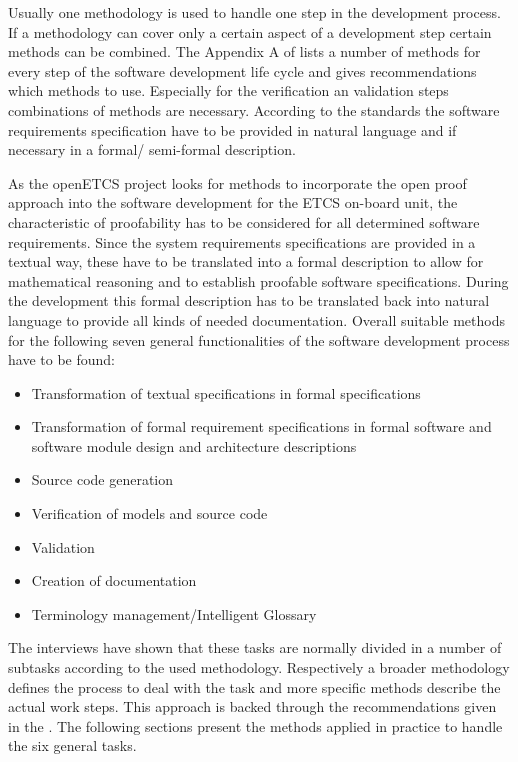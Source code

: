 \documentclass{./template/openetcs_report}
\begin{document}
\label{chap: methods}

Usually one methodology is used to handle one step in the development process. If a methodology can cover only a certain aspect of a development step certain methods can be combined. The Appendix A of \citeauthor{EN50128:2011} lists a number of methods for every step of the software development life cycle and gives recommendations which methods  to use. Especially for the verification an validation steps combinations of methods are necessary. According to the standards the software requirements specification have to be provided  in natural language and if necessary in a formal/ semi-formal description. 

As the openETCS project looks for methods to incorporate the open proof approach into the software development  for the ETCS on-board unit, the  characteristic of proofability has to be considered for all determined software requirements. Since  the system requirements specifications are provided in a textual way, these have to be translated into a formal description to allow for mathematical reasoning and to establish proofable software specifications. During the development this formal description has to be translated back into natural language to provide all kinds of needed documentation. Overall suitable methods for the following seven general functionalities of the software development process have to be found:

\vspace{-10pt}
\begin{itemize}[topsep=2pt, partopsep=2pt,itemsep=2pt,parsep=2pt]
\item Transformation of textual specifications in formal specifications
\item Transformation of formal requirement specifications in formal software and software module design and architecture descriptions
\item Source code generation
\item Verification of models and source code
\item Validation
\item Creation of documentation
\item Terminology management/Intelligent Glossary
\end{itemize}

The interviews have shown that these tasks are normally divided in a number of subtasks according to the used methodology. Respectively a broader methodology defines the  process to deal with the task and more specific methods describe the actual work steps. This approach is backed through the recommendations given in the \citeauthor{EN50128:2011}. The following sections present the methods applied in practice to handle the six general tasks.
\end{document}
